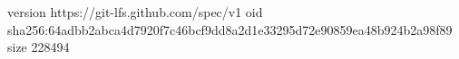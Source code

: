 version https://git-lfs.github.com/spec/v1
oid sha256:64adbb2abca4d7920f7c46bcf9dd8a2d1e33295d72e90859ea48b924b2a98f89
size 228494

